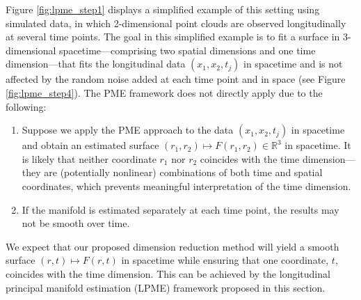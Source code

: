 \documentclass[11pt,reqno]{article}
\theoremstyle{definition}
\begin{document}
Figure \ref{fig:lpme_step1} displays a simplified example of this setting using simulated data, in which 2-dimensional point clouds are observed longitudinally at several time points. The goal in this simplified example is to fit a surface in 3-dimensional spacetime---comprising two spatial dimensions and one time dimension---that fits the longitudinal data $(x_1, x_2, t_j)$ in spacetime and is not affected by the random noise added at each time point and in space (see Figure \ref{fig:lpme_step4}). The PME framework does not directly apply due to the following:
\begin{enumerate}
    \item Suppose we apply the PME approach to the data $(x_1, x_2, t_j)$ in spacetime and obtain an estimated surface $(r_1, r_2) \mapsto F(r_1, r_2)\in\mathbb{R}^3$ in spacetime. It is likely that neither coordinate $r_1$ nor $r_2$ coincides with the time dimension---they are (potentially nonlinear) combinations of both time and spatial coordinates, which prevents meaningful interpretation of the time dimension.

    \item If the manifold is estimated separately at each time point, the results may not be smooth over time.
\end{enumerate}
We expect that our proposed dimension reduction method will yield a smooth surface $(r,t)\mapsto F(r,t)$ in spacetime while ensuring that one coordinate, $t$, coincides with the time dimension. This can be achieved by the longitudinal principal manifold estimation (LPME) framework proposed in this section.

\end{document}
